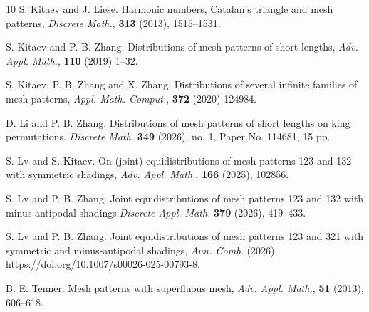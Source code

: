\documentclass[10pt,a4paper]{article}
\begin{document}
\begin{thebibliography}{10}
 S. Kitaev and J. Liese. Harmonic numbers, Catalan's triangle and mesh patterns, {\em Discrete Math.}, {\bf 313} (2013), 1515--1531.

 S. Kitaev and P. B. Zhang. Distributions of mesh patterns of short lengths, {\em Adv. Appl. Math.}, {\bf 110} (2019) 1--32.

  S. Kitaev, P. B. Zhang and X. Zhang. Distributions of several infinite families of mesh patterns, {\em Appl. Math. Comput.}, {\bf 372} (2020) 124984.

 D. Li and P. B. Zhang. Distributions of mesh patterns of short lengths on king permutations. {\em Discrete Math.} {\bf 349} (2026), no. 1, Paper No. 114681, 15 pp.

 S. Lv  and S. Kitaev. On (joint) equidistributions of mesh patterns 123 and 132 with symmetric shadings, {\em Adv. Appl. Math.}, {\bf 166} (2025), 102856.

 S. Lv and P. B. Zhang. Joint equidistributions of mesh patterns 123 and 132 with minus antipodal shadings.{\em Discrete Appl. Math.} {\bf 379} (2026), 419--433.

 S. Lv and P. B. Zhang. Joint equidistributions of mesh patterns 123 and 321 with symmetric and minus-antipodal shadings, {\em Ann. Comb.} (2026). https://doi.org/10.1007/s00026-025-00793-8.

  B. E. Tenner. Mesh patterns with superfluous mesh, {\em Adv. Appl. Math.}, {\bf 51} (2013), 606--618.
	
\end{thebibliography}
\end{document}
